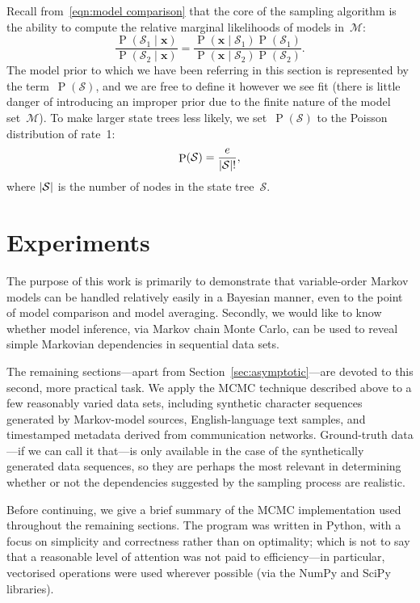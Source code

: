 \documentclass[11pt,a4paper]{article}
\newcommand\mc[1]{\mathcal{#1}}               %
\newcommand\ub[1]{\symbf{#1}}                 %
\DeclareMathOperator\Pb{P}                    %
\DeclarePairedDelimiter\abs{\lvert}{\rvert}   %
\begin{document}
Recall from~\eqref{eqn:model comparison} that the core of the sampling algorithm
is the ability to compute the relative marginal likelihoods of models
in~\(\mc{M}\):
\begin{equation*}
  \frac{\Pb(\mc{S}_1 \mid \ub{x})}{\Pb(\mc{S}_2 \mid \ub{x})} =
    \frac{\Pb(\ub{x} \mid \mc{S}_1) \Pb(\mc{S}_1)}
    {\Pb(\ub{x} \mid \mc{S}_2) \Pb(\mc{S}_2)}.
\end{equation*}
The model prior to which we have been referring in this section is represented
by the term~\(\Pb(\mc{S})\), and we are free to define it however we see fit
(there is little danger of introducing an improper prior due to the finite
nature of the model set~\(\mc{M}\)). To make larger state trees less likely, we
set~\(\Pb(\mc{S})\) to the Poisson distribution of rate~1:
\begin{equation*}
  \Pb(\mc{S}) = \frac{e}{\abs{\mc{S}}!},
\end{equation*}
where \(\abs{\mc{S}}\) is the number of nodes in the state tree~\(\mc{S}\).

\section{Experiments}\label{sec:experiments} %

The purpose of this work is primarily to demonstrate that variable-order Markov
models can be handled relatively easily in a Bayesian manner, even to the point
of model comparison and model averaging. Secondly, we would like to know whether
model inference, via Markov chain Monte Carlo, can be used to reveal simple
Markovian dependencies in sequential data sets.

The remaining sections---apart from Section~\ref{sec:asymptotic}---are devoted
to this second, more practical task. We apply the MCMC technique described above
to a few reasonably varied data sets, including synthetic character sequences
generated by Markov-model sources, English-language text samples, and
timestamped metadata derived from communication networks. Ground-truth data---if
we can call it that---is only available in the case of the synthetically
generated data sequences, so they are perhaps the most relevant in determining
whether or not the dependencies suggested by the sampling process are realistic.

Before continuing, we give a brief summary of the MCMC implementation used
throughout the remaining sections. The program was written in Python, with a
focus on simplicity and correctness rather than on optimality; which is not to
say that a reasonable level of attention was not paid to efficiency---in
particular, vectorised operations were used wherever possible (via the NumPy and
SciPy libraries). 
\end{document}
